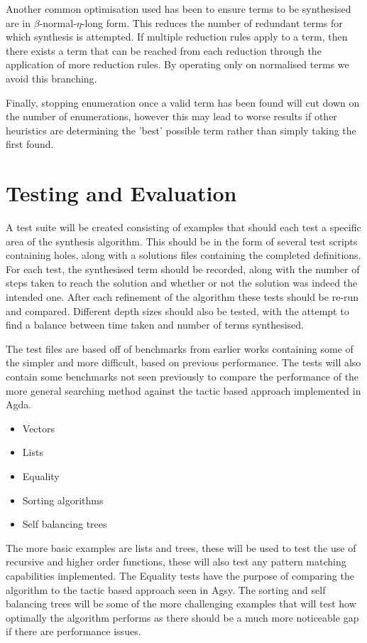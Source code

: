 \documentclass[a4paper]{article}
\begin{document}
Another common optimisation used has been to ensure terms to be synthesised are in \(\beta\)-normal-\(\eta\)-long form. This 
reduces the number of redundant terms for which synthesis is attempted. If multiple reduction rules apply to a term,
then there exists a term that can be reached from each reduction through the application of more reduction rules. \cite{10.5555/2788232}
By operating only on normalised terms we avoid this branching.

Finally, stopping enumeration once a valid term has been found will cut down on the 
number of enumerations, however this may lead to worse results if other heuristics are determining the 'best' possible
term rather than simply taking the first found. 

\section{Testing and Evaluation}
\label{sec:org4dab837}

A test suite will be created consisting of examples that should each test a specific area of the synthesis algorithm. 
This should be in the form of several test scripts containing holes, along with a solutions files containing the 
completed definitions. For each test, the synthesised term should be recorded, along with the number of steps 
taken to reach the solution and whether or not the solution was indeed the intended one. After each refinement of the 
algorithm these tests should be re-run and compared. Different depth sizes should also be tested, with the attempt
to find a balance between time taken and number of terms synthesised.  

The test files are based off of benchmarks from earlier works containing some of the simpler and more 
difficult, based on previous performance. The tests will also contain some benchmarks not seen previously to compare the
performance of the more general searching method against the tactic based approach implemented in Agda.   

\begin{itemize}
\item Vectors
\item Lists
\item Equality
\item Sorting algorithms
\item Self balancing trees
\end{itemize}

The more basic examples are lists and trees, these will be used to test the use of recursive and higher order 
functions, these will also test any pattern matching capabilities implemented. The Equality tests have the purpose of 
comparing the algorithm to the tactic based approach seen in Agsy. The sorting and self balancing trees will be some of the 
more challenging examples that will test how optimally the algorithm performs as there should be a much more noticeable 
gap if there are performance issues. 
\end{document}
